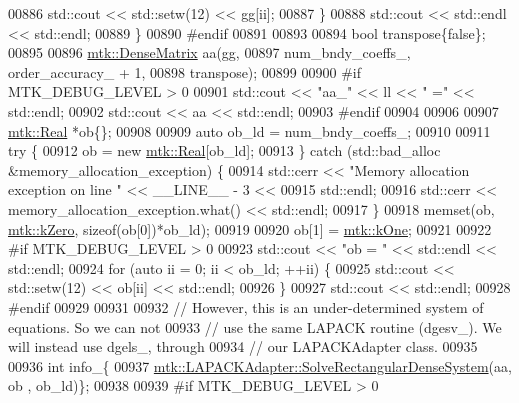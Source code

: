 \begin{DoxyCode}
{{00886         std::cout << std::setw(12) << gg[ii];
00887       \}
00888       std::cout << std::endl << std::endl;
00889     \}
00890 \textcolor{preprocessor}{    #endif}
00891 
00893 
00894     \textcolor{keywordtype}{bool} transpose\{\textcolor{keyword}{false}\};
00895 
00896     \hyperlink{classmtk_1_1DenseMatrix}{mtk::DenseMatrix} aa(gg,
00897                          num\_bndy\_coeffs\_, order\_accuracy\_ + 1,
00898                          transpose);
00899 
00900 \textcolor{preprocessor}{    #if MTK\_DEBUG\_LEVEL > 0}
00901     std::cout << \textcolor{stringliteral}{"aa\_"} << ll << \textcolor{stringliteral}{" ="} << std::endl;
00902     std::cout << aa << std::endl;
00903 \textcolor{preprocessor}{    #endif}
00904 
00906 
00907     \hyperlink{group__c01-roots_gac080bbbf5cbb5502c9f00405f894857d}{mtk::Real} *ob\{\};
00908 
00909     \textcolor{keyword}{auto} ob\_ld = num\_bndy\_coeffs\_;
00910 
00911     \textcolor{keywordflow}{try} \{
00912       ob = \textcolor{keyword}{new} \hyperlink{group__c01-roots_gac080bbbf5cbb5502c9f00405f894857d}{mtk::Real}[ob\_ld];
00913     \} \textcolor{keywordflow}{catch} (std::bad\_alloc &memory\_allocation\_exception) \{
00914       std::cerr << \textcolor{stringliteral}{"Memory allocation exception on line "} << \_\_LINE\_\_ - 3 <<
00915         std::endl;
00916       std::cerr << memory\_allocation\_exception.what() << std::endl;
00917     \}
00918     memset(ob, \hyperlink{group__c01-roots_ga59a451a5fae30d59649bcda274fea271}{mtk::kZero}, \textcolor{keyword}{sizeof}(ob[0])*ob\_ld);
00919 
00920     ob[1] = \hyperlink{group__c01-roots_ga26407c24d43b6b95480943340d285c71}{mtk::kOne};
00921 
00922 \textcolor{preprocessor}{    #if MTK\_DEBUG\_LEVEL > 0}
00923     std::cout << \textcolor{stringliteral}{"ob = "} << std::endl << std::endl;
00924     \textcolor{keywordflow}{for} (\textcolor{keyword}{auto} ii = 0; ii < ob\_ld; ++ii) \{
00925       std::cout << std::setw(12) << ob[ii] << std::endl;
00926     \}
00927     std::cout << std::endl;
00928 \textcolor{preprocessor}{    #endif}
00929 
00931 
00932     \textcolor{comment}{// However, this is an under-determined system of equations. So we can not}
00933     \textcolor{comment}{// use the same LAPACK routine (dgesv\_). We will instead use dgels\_, through}
00934     \textcolor{comment}{// our LAPACKAdapter class.}
00935 
00936     \textcolor{keywordtype}{int} info\_\{
00937       \hyperlink{classmtk_1_1LAPACKAdapter_a380f148ffdf96bae2f79ae28f1a6560c}{mtk::LAPACKAdapter::SolveRectangularDenseSystem}(aa, ob
      , ob\_ld)\};
00938 
00939 \textcolor{preprocessor}{    #if MTK\_DEBUG\_LEVEL > 0}
}}
\end{DoxyCode}
